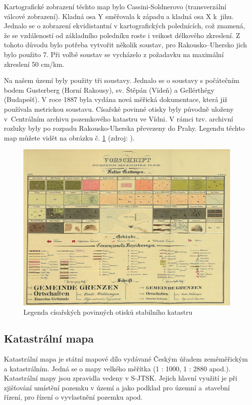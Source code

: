\documentclass[thesis=M,czech]{FITthesis}[2012/06/26]
\begin{document}
Kartografické zobrazení těchto map bylo Cassini-Soldnerovo (transverzální válcové zobrazení). Kladná osa Y směřovala k západu a kladná osa X k~jihu. Jednalo se o zobrazení ekvidistantní v kartografických polednících, což znamená, že se vzdáleností od základního poledníku roste i veikost délkového zkreslení. Z tohoto důvodu bylo potřeba vytvořit několik soustav, pro Rakousko–Uhersko jich bylo použito 7. Při volbě soustav se vycházelo z požadavku na maximální zkreslení 50 cm/km. 

Na našem území byly použity tři soustavy. Jednalo se o soustavy s počátečním bodem Gusterberg (Horní Rakousy), sv. Štěpán (Vídeň) a Gellérthégy (Budapešť). V roce 1887 byla vydána nová měřická dokumentace, která již používala metrickou soustavu. Císařské povinné otisky byly původně uloženy v~Centrálním archivu pozemkového katastru ve Vídni. V rámci tzv. archivní rozluky byly po rozpadu Rakousko-Uherska převezeny do Prahy. Legendu těchto map můžete vidět na obrázku č. \ref{obrazek:legenda} (zdroj: \cite{cpo_legenda}). \cite{mapko}


\begin{figure}[h]
	\centering
	\includegraphics[width=13cm]{pics/legenda_CPO.png}
	\caption{Legenda císařských povinných otisků stabilního katastru}
	\label{obrazek:legenda}
\end{figure}

\subsection{Katastrální mapa}
Katastrální mapa je státní mapové dílo vydávané Českým úřadem zeměměřickým a katastrálním. Jedná se o mapy velkého měřítka (1 : 1000, 1 : 2880 apod.). Katastrální mapy jsou zpravidla vedeny v S-JTSK. Jejich hlavní využití je při zjišťování umístění pozemku v území a jako podklad pro územní a~stavební řízení, pro řízení o vyvlastnění pozemku apod. 
\end{document}
